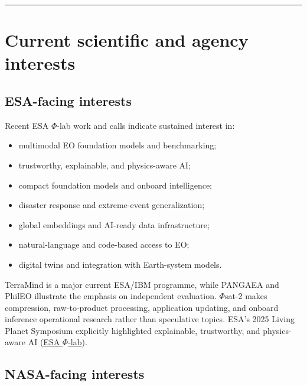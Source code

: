 \documentclass[
  a4paper,
  11pt]{article}
\providecommand{\tightlist}{%
  \setlength{\itemsep}{0pt}\setlength{\parskip}{0pt}}
\begin{document}
\begin{center}\rule{0.5\linewidth}{0.5pt}\end{center}

\hypertarget{current-scientific-and-agency-interests}{%
\section{Current scientific and agency
interests}\label{current-scientific-and-agency-interests}}

\hypertarget{esa-facing-interests}{%
\subsection{ESA-facing interests}\label{esa-facing-interests}}

Recent ESA \(\Phi\)-lab work and calls indicate sustained interest in:

\begin{itemize}
\tightlist
\item
  multimodal EO foundation models and benchmarking;
\item
  trustworthy, explainable, and physics-aware AI;
\item
  compact foundation models and onboard intelligence;
\item
  disaster response and extreme-event generalization;
\item
  global embeddings and AI-ready data infrastructure;
\item
  natural-language and code-based access to EO;
\item
  digital twins and integration with Earth-system models.
\end{itemize}

TerraMind is a major current ESA/IBM programme, while PANGAEA and PhilEO
illustrate the emphasis on independent evaluation. \(\Phi\)sat-2 makes
compression, raw-to-product processing, application updating, and
onboard inference operational research rather than speculative topics.
ESA's 2025 Living Planet Symposium explicitly highlighted explainable,
trustworthy, and physics-aware AI
(\href{https://philab.esa.int/unmissable-\%CF\%86-lab-moments-at-lps-2025/}{ESA
\(\Phi\)-lab}).

\hypertarget{nasa-facing-interests}{%
\subsection{NASA-facing interests}\label{nasa-facing-interests}}
\end{document}
